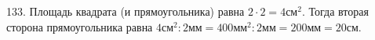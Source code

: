 133. Площадь квадрата (и прямоугольника) равна $2\cdot2=4\text{см}^2.$ Тогда вторая сторона прямоугольника равна $4\text{см}^2:2\text{мм}=400\text{мм}^2:2\text{мм}=
200\text{мм}=20$см.\\
